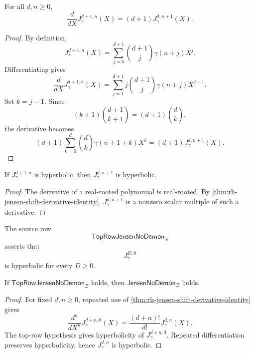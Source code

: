 \begin{theorem}
\label{thm:rh-jensen-shift-derivative-identity}
For all $d,n\ge0$,
$$
\frac{d}{dX}J_{\gamma}^{d+1,n}(X)
=
(d+1)J_{\gamma}^{d,n+1}(X).
$$
\end{theorem}

\begin{proof}
By definition,
$$
J_{\gamma}^{d+1,n}(X)
=
\sum_{j=0}^{d+1}
\binom{d+1}{j}\gamma(n+j)X^j.
$$
Differentiating gives
$$
\frac{d}{dX}J_{\gamma}^{d+1,n}(X)
=
\sum_{j=1}^{d+1}
j\binom{d+1}{j}\gamma(n+j)X^{j-1}.
$$
Set $k=j-1$.  Since
$$
(k+1)\binom{d+1}{k+1}
=
(d+1)\binom{d}{k},
$$
the derivative becomes
$$
(d+1)
\sum_{k=0}^{d}
\binom{d}{k}\gamma(n+1+k)X^k
=
(d+1)J_{\gamma}^{d,n+1}(X).
$$
\end{proof}

\begin{corollary}
\label{cor:rh-jensen-derivative-propagation}
If $J_{\gamma}^{d+1,n}$ is hyperbolic, then $J_{\gamma}^{d,n+1}$ is
hyperbolic.
\end{corollary}

\begin{proof}
The derivative of a real-rooted polynomial is real-rooted.  By
\autoref{thm:rh-jensen-shift-derivative-identity},
$J_{\gamma}^{d,n+1}$ is a nonzero scalar multiple of such a derivative.
\end{proof}

\begin{definition}
\label{def:rh-top-row-jensen-no-demon}
The source row
$$
\mathsf{TopRowJensenNoDemon}_{\Xi}
$$
asserts that
$$
J_{\gamma}^{D,0}
$$
is hyperbolic for every $D\ge0$.
\end{definition}

\begin{theorem}
\label{thm:rh-top-row-supplies-all-jensen-sections}
If $\mathsf{TopRowJensenNoDemon}_{\Xi}$ holds, then
$\mathsf{JensenNoDemon}_{\Xi}$ holds.
\end{theorem}

\begin{proof}
For fixed $d,n\ge0$, repeated use of
\autoref{thm:rh-jensen-shift-derivative-identity} gives
$$
\frac{d^n}{dX^n}J_{\gamma}^{d+n,0}(X)
=
\frac{(d+n)!}{d!}J_{\gamma}^{d,n}(X).
$$
The top-row hypothesis gives hyperbolicity of $J_{\gamma}^{d+n,0}$.
Repeated differentiation preserves hyperbolicity, hence
$J_{\gamma}^{d,n}$ is hyperbolic.
\end{proof}

